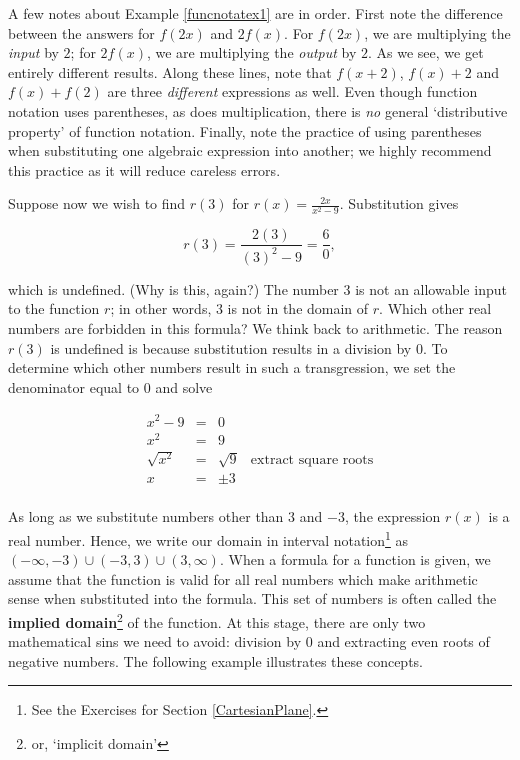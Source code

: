 A few notes about Example \ref{funcnotatex1} are in order.  First note the difference between the answers for $f(2x)$ and $2f(x)$.  For $f(2x)$, we are multiplying the \textit{input} by $2$;  for $2 f(x)$, we are multiplying the \textit{output} by $2$.  As we see, we get entirely different results.  Along these lines, note that $f(x+2)$, $f(x) + 2$ and $f(x) + f(2)$ are three \textit{different} expressions as well.  Even though function notation uses parentheses, as does multiplication, there is \textit{no} general `distributive property' of function notation. Finally, note the practice of using parentheses when substituting one algebraic expression into another;  we highly recommend this practice as it will reduce careless errors. 

\smallskip
\enlargethispage{.1in}

Suppose now we wish to find $r(3)$ for $r(x) = \frac{2x}{x^2 - 9}$.  Substitution gives

\[r(3) = \dfrac{2(3)}{(3)^2-9} = \dfrac{6}{0},\]

which is undefined. (Why is this, again?) The number $3$ is not an allowable input to the function $r$;  in other words, $3$ is not in the domain of $r$.  Which other real numbers are forbidden in this formula?  We think back to arithmetic.  The reason $r(3)$ is undefined is because substitution results in a division by $0$.  To determine which other numbers result in such a transgression, we set the denominator equal to $0$ and solve

\[ \begin{array}{rclr}  
x^2 - 9 & = & 0  & \\
x^2 & = & 9 & \\
\sqrt{x^2} & = & \sqrt{9} & \mbox{extract square roots}  \\
x & = & \pm 3 & \\ 
\end{array} \]

As long as we substitute numbers other than $3$ and $-3$, the expression $r(x)$ is a real number.  Hence, we write our domain in interval notation\footnote{See the Exercises for Section \ref{CartesianPlane}.} as  $(-\infty, -3) \cup (-3,3) \cup (3, \infty)$.  When a formula for a function is given, we assume that the function is valid for all real numbers which make arithmetic sense when substituted into the formula.  This set of numbers is often called the \textbf{implied domain}\footnote{or, `implicit domain'} of the function.  At this stage, there are only two mathematical sins we need to avoid:  division by $0$ and extracting even roots of negative numbers.  The following example illustrates these concepts.

